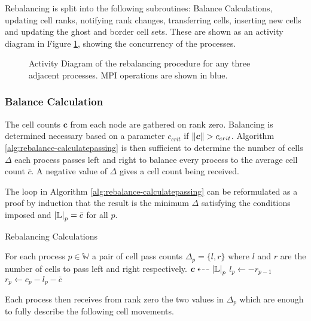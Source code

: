 \documentclass{IIBproject}
\newcommand{\vect}[1]{\bm{#1}}
\newcommand{\dla}{\dashleftarrow}
\begin{document}
Rebalancing is split into the following subroutines: Balance Calculations, updating cell ranks, notifying rank changes, transferring cells, inserting new cells and updating the ghost and border cell sets. These are shown as an activity diagram in Figure \ref{fig:rebalance-overview}, showing the concurrency of the processes.

\begin{figure}[H]
	\caption{Activity Diagram of the rebalancing procedure for any three adjacent processes. MPI operations are shown in blue.}
	\label{fig:rebalance-overview}
	
\end{figure}


\subsubsection{Balance Calculation}
\label{sec:rebalancing-calc}

The cell counts $\vect{c}$ from each node are gathered on rank zero. Balancing is determined necessary based on a parameter $c_{crit}$ if $\norm{\vect{c}}>c_{crit}$. Algorithm \ref{alg:rebalance-calculatepassing} is then sufficient to determine the number of cells $\Delta$ each process passes left and right to balance every process to the average cell count $\bar c$. A negative value of $\Delta$ gives a cell count being received. 

The loop in Algorithm \ref{alg:rebalance-calculatepassing} can be reformulated as a proof by induction that the result is the minimum $\Delta$ satisfying the conditions imposed and $\abs{\mathbb{L}}_p=\bar c$ for all $p$.

\begin{algorithm}[H]
\caption{Rebalancing Calculations}
\label{alg:rebalance-calculatepassing}

\begin{algorithmic}
\Ensure For each process $p \in \mathbb{W}$ a pair of cell pass counts $\Delta_p = \{l,r\}$ where $l$ and $r$ are the number of cells to pass left and right respectively.
\Statex
\Gather $\vect{c} \dla \abs{\mathbb{L}}_p $
	\State $l_p \gets -r_{p-1}$
	\State $r_p \gets c_p - l_p - \bar{c}$
\EndFor
\end{algorithmic}
\end{algorithm}

Each process then receives from rank zero the two values in $\Delta_p$ which are enough to fully describe the following cell movements. 
\end{document}
